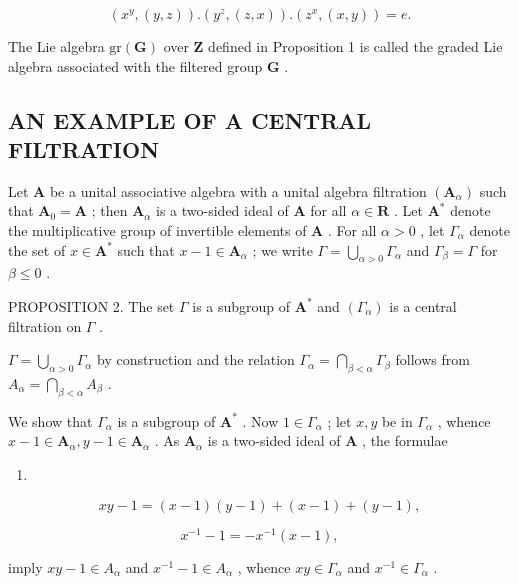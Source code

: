 \[
\left(x ^ {y}, (y, z)\right). \left(y ^ {z}, (z, x)\right). \left(z ^ {x}, (x, y)\right) = e.\tag{20}
\]

The Lie algebra \(\mathrm{gr}(\mathbf{G})\) over \(\mathbf{Z}\) defined in Proposition 1 is called the graded Lie algebra associated with the filtered group \(\mathbf{G}\) .

\subsection{AN EXAMPLE OF A CENTRAL FILTRATION}

Let \(\mathbf{A}\) be a unital associative algebra with a unital algebra filtration \((\mathbf{A}_{\alpha})\) such that \(\mathbf{A}_{0} = \mathbf{A}\) ; then \(\mathbf{A}_{\alpha}\) is a two-sided ideal of \(\mathbf{A}\) for all \(\alpha \in \mathbf{R}\) . Let \(\mathbf{A}^*\) denote the multiplicative group of invertible elements of \(\mathbf{A}\) . For all \(\alpha > 0\) , let \(\Gamma_{\alpha}\) denote the set of \(x \in \mathbf{A}^*\) such that \(x - 1 \in \mathbf{A}_{\alpha}\) ; we write \(\Gamma = \bigcup_{\alpha > 0} \Gamma_{\alpha}\) and \(\Gamma_{\beta} = \Gamma\) for \(\beta \leqslant 0\) .

PROPOSITION 2. The set \(\Gamma\) is a subgroup of \(\mathbf{A}^*\) and \((\Gamma_{\alpha})\) is a central filtration on \(\Gamma\) .

\(\Gamma = \bigcup_{\alpha > 0} \Gamma_{\alpha}\) by construction and the relation \(\Gamma_{\alpha} = \bigcap_{\beta < \alpha} \Gamma_{\beta}\) follows from \(A_{\alpha} = \bigcap_{\beta < \alpha} A_{\beta}\) .

We show that \(\Gamma_{\alpha}\) is a subgroup of \(\mathbf{A}^*\) . Now \(1 \in \Gamma_{\alpha}\) ; let \(x, y\) be in \(\Gamma_{\alpha}\) , whence \(x - 1 \in \mathbf{A}_{\alpha}, y - 1 \in \mathbf{A}_{\alpha}\) . As \(\mathbf{A}_{\alpha}\) is a two-sided ideal of \(\mathbf{A}\) , the formulae

\begin{enumerate}
\def\labelenumi{(\arabic{enumi})}
\setcounter{enumi}{20}
\tightlist
\item
\end{enumerate}

\[
x y - 1 = (x - 1) (y - 1) + (x - 1) + (y - 1),\tag{21}
\]

\[
x ^ {- 1} - 1 = - x ^ {- 1} (x - 1),\tag{22}
\]

imply \(xy - 1 \in A_{\alpha}\) and \(x^{-1} - 1 \in A_{\alpha}\) , whence \(xy \in \Gamma_{\alpha}\) and \(x^{-1} \in \Gamma_{\alpha}\) .


